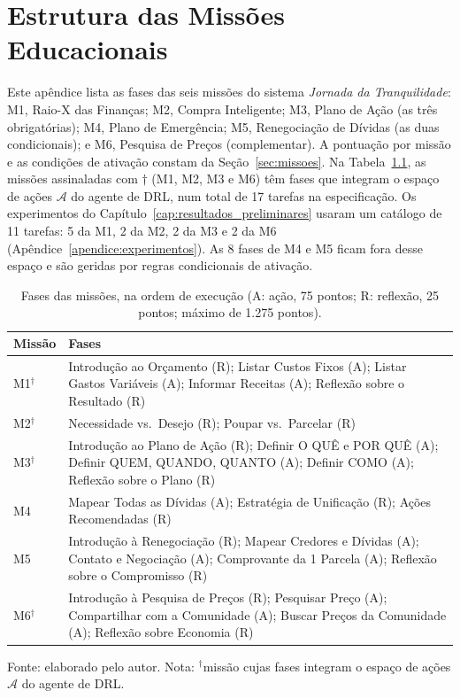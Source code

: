 \chapter{Estrutura das Missões Educacionais}
\label{apendice:missoes}

Este apêndice lista as fases das seis missões do sistema \textit{Jornada da Tranquilidade}: M1, Raio-X das Finanças; M2, Compra Inteligente; M3, Plano de Ação (as três obrigatórias); M4, Plano de Emergência; M5, Renegociação de Dívidas (as duas condicionais); e M6, Pesquisa de Preços (complementar). A pontuação por missão e as condições de ativação constam da Seção~\ref{sec:missoes}. Na Tabela~\ref{tab:missoes_completa}, as missões assinaladas com $\dagger$ (M1, M2, M3 e M6) têm fases que integram o espaço de ações $\mathcal{A}$ do agente de DRL, num total de 17 tarefas na especificação. Os experimentos do Capítulo~\ref{cap:resultados_preliminares} usaram um catálogo de 11 tarefas: 5 da M1, 2 da M2, 2 da M3 e 2 da M6 (Apêndice~\ref{apendice:experimentos}). As 8 fases de M4 e M5 ficam fora desse espaço e são geridas por regras condicionais de ativação.

\begin{table}[htbp]
\centering
\small
\caption[Fases das missões do sistema]{Fases das missões, na ordem de execução (A: ação, 75 pontos; R: reflexão, 25 pontos; máximo de 1.275 pontos).}
\label{tab:missoes_completa}
\begin{tabular}{lp{}}
\hline
\textbf{Missão} & \textbf{Fases} \\
\hline
M1$^{\dagger}$ & Introdução ao Orçamento (R); Listar Custos Fixos (A); Listar Gastos Variáveis (A); Informar Receitas (A); Reflexão sobre o Resultado (R) \\
M2$^{\dagger}$ & Necessidade vs.\ Desejo (R); Poupar vs.\ Parcelar (R) \\
M3$^{\dagger}$ & Introdução ao Plano de Ação (R); Definir O QUÊ e POR QUÊ (A); Definir QUEM, QUANDO, QUANTO (A); Definir COMO (A); Reflexão sobre o Plano (R) \\
M4 & Mapear Todas as Dívidas (A); Estratégia de Unificação (R); Ações Recomendadas (R) \\
M5 & Introdução à Renegociação (R); Mapear Credores e Dívidas (A); Contato e Negociação (A); Comprovante da 1\textordfeminine{} Parcela (A); Reflexão sobre o Compromisso (R) \\
M6$^{\dagger}$ & Introdução à Pesquisa de Preços (R); Pesquisar Preço (A); Compartilhar com a Comunidade (A); Buscar Preços da Comunidade (A); Reflexão sobre Economia (R) \\
\hline
\end{tabular}

{\footnotesize Fonte: elaborado pelo autor. Nota: $^{\dagger}$missão cujas fases integram o espaço de ações $\mathcal{A}$ do agente de DRL.}
\end{table}

